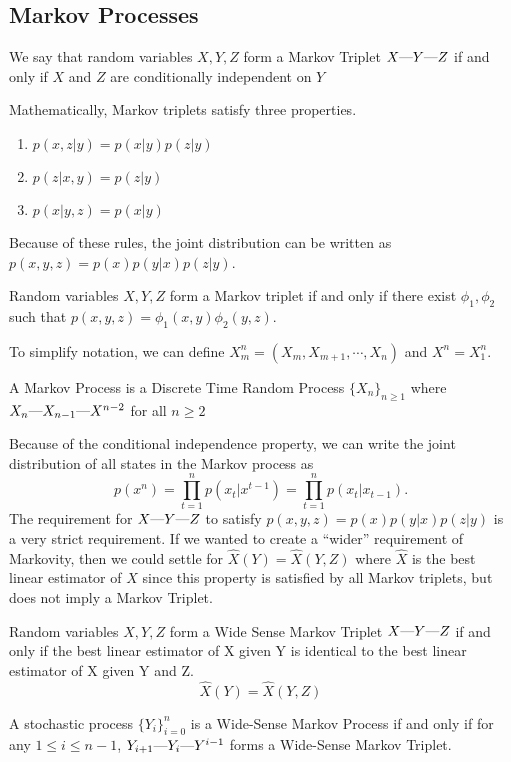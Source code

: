 \subsection{Markov Processes}
\begin{definition}
	We say that random variables $X, Y, Z$ form a Markov Triplet $X\text{\textemdash}Y\text{\textemdash}Z$ if and only if $X$ and $Z$ are conditionally independent on $Y$
	\label{defn:markov-triplet}
\end{definition}
Mathematically, Markov triplets satisfy three properties.
\begin{enumerate}
	\item $p(x, z | y) = p(x|y)p(z|y)$
	\item $p(z|x, y) = p(z|y)$
	\item $p(x|y, z) = p(x|y)$
\end{enumerate}
Because of these rules, the joint distribution can be written as $p(x, y, z) = p(x)p(y|x)p(z|y)$.
\begin{theorem}
	Random variables $X,Y,Z$ form a Markov triplet if and only if there exist $\phi_1, \phi_2$ such that $p(x, y, z) = \phi_1(x, y)\phi_2(y, z)$.
	\label{thm:markov-triplet}
\end{theorem}
To simplify notation, we can define $X_m^n = \left(X_m,X_{m+1},\cdots, X_n\right)$ and $X^n=X_1^n$.
\begin{definition}
	A Markov Process is a Discrete Time Random Process $\{X_n\}_{n\geq1}$ where $X_n\text{\textemdash}X_{n-1}\text{\textemdash}X^{n-2}$ for all $n\geq 2$
	\label{defn:markov-process}
\end{definition}
Because of the conditional independence property, we can write the joint distribution of all states in the Markov process as \[
	p(x^n) = \prod_{t=1}^n p(x_t|x^{t-1}) = \prod_{t=1}^np(x_t|x_{t-1}).
\]
The requirement for $X\text{\textemdash}Y\text{\textemdash}Z$ to satisfy $p(x, y, z) = p(x)p(y|x)p(z|y)$ is a very strict requirement.
If we wanted to create a ``wider'' requirement of Markovity, then we could settle for $\hat{X}(Y) = \hat{X}(Y, Z)$ where $\hat{X}$ is the best linear estimator of $X$ since this property is satisfied by all Markov triplets, but does not imply a Markov Triplet.
\begin{definition}
	Random variables $X, Y, Z$ form a Wide Sense Markov Triplet $X\text{\textemdash}Y\text{\textemdash}Z$ if and only if the best linear estimator of X given Y is identical to the best linear estimator of X given Y and Z.
	\[
		\hat{X}(Y) = \hat{X}(Y, Z)
	\]
	\label{defn:wss-markov-triplet}
\end{definition}
\begin{definition}
	A stochastic process $\{Y_i\}_{i=0}^n$ is a Wide-Sense Markov Process if and only if for any $1 \leq i \leq n - 1$, $Y_{i+1}\text{\textemdash}Y_i\text{\textemdash}Y^{i-1}$ forms a Wide-Sense Markov Triplet.
	\label{defn:ws-markov}
\end{definition}
